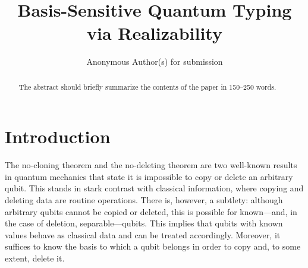 \documentclass[runningheads,orivec]{llncs}
\begin{document}
\title{Basis-Sensitive Quantum Typing via Realizability}

\author{Anonymous Author(s) for submission}

%
%

\maketitle 

\begin{abstract}
  The abstract should briefly summarize the contents of the paper in 150--250 words.

\end{abstract}



\section{Introduction}
The no-cloning theorem \cite{WoottersZurek1982} and the no-deleting theorem
\cite{PatiBraunstein2000} are two well-known results in quantum mechanics that
state it is impossible to copy or delete an arbitrary qubit. This stands in
stark contrast with classical information, where copying and deleting data are
routine operations. There is, however, a subtlety: although arbitrary qubits
cannot be copied or deleted, this is possible for known---and, in the case of
deletion, separable---qubits. This implies that qubits with known values behave
as classical data and can be treated accordingly. Moreover, it suffices to know
the basis to which a qubit belongs in order to copy and, to some extent, delete it.
\end{document}
